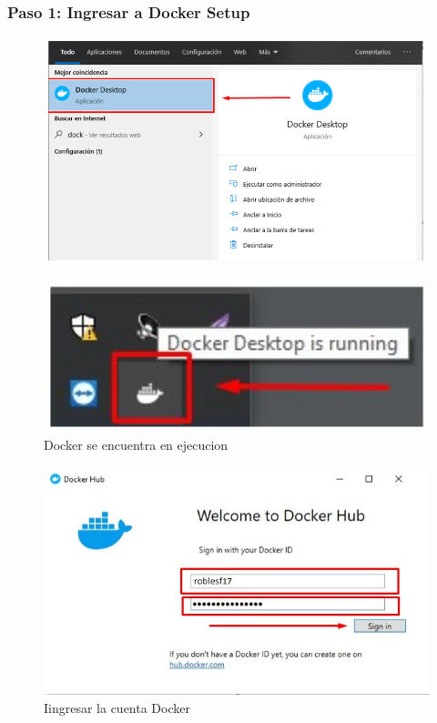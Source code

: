 \documentclass[preprint,12pt]{elsarticle}
\begin{document}
\subsubsection{\textbf{Paso 1: Ingresar a Docker Setup}}
\begin{figure}[H]
	\begin{center}
		\includegraphics[width=12cm]{./IMAGENES/foto1} 
	\end{center}
\end{figure}

\begin{figure}[H]
	\begin{center}
		\includegraphics[width=12cm]{./IMAGENES/foto2} 
		\caption{Docker se encuentra en ejecucion}
	\end{center}
\end{figure}

\begin{figure}[H]
	\begin{center}
		\includegraphics[width=12cm]{./IMAGENES/foto3} 
		\caption{Iingresar la cuenta Docker}
	\end{center}
\end{figure}
\end{document}
